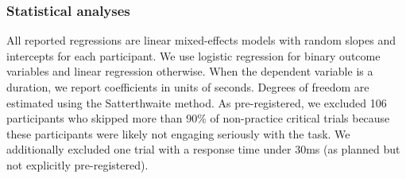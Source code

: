 

\subsubsection{Statistical analyses}

All reported regressions are linear mixed-effects models with random slopes and intercepts for each participant. We use logistic regression for binary outcome variables and linear regression otherwise. When the dependent variable is a duration, we report coefficients in units of seconds. Degrees of freedom are estimated using the Satterthwaite method. As pre-registered, we excluded 106 participants who skipped more than 90\% of non-practice critical trials because these participants were likely not engaging seriously with the task. We additionally excluded one trial with a response time under 30ms (as planned but not explicitly pre-registered).


